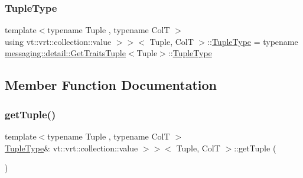 \subsubsection{\texorpdfstring{Tuple\+Type}{TupleType}}
{\footnotesize\ttfamily template$<$typename Tuple , typename ColT $>$ \\
using vt\+::vrt\+::collection\+::value $>$$>$$<$ Tuple, ColT $>$\+::\hyperlink{structvt_1_1vrt_1_1collection_1_1_param_col_msg_3_01_tuple_00_01_col_t_00_01std_1_1enable__if__te13868956e9675e27cec8f332bda9d5e_a86867847002b70c52126323faa830dd6}{Tuple\+Type} =  typename \hyperlink{structvt_1_1messaging_1_1detail_1_1_get_traits_tuple}{messaging\+::detail\+::\+Get\+Traits\+Tuple}$<$Tuple$>$\+::\hyperlink{structvt_1_1vrt_1_1collection_1_1_param_col_msg_3_01_tuple_00_01_col_t_00_01std_1_1enable__if__te13868956e9675e27cec8f332bda9d5e_a86867847002b70c52126323faa830dd6}{Tuple\+Type}}



\subsection{Member Function Documentation}
\mbox{\label{structvt_1_1vrt_1_1collection_1_1_param_col_msg_3_01_tuple_00_01_col_t_00_01std_1_1enable__if__te13868956e9675e27cec8f332bda9d5e_afc5714cc55c3b21fb9f1093863ad29b6}} 
\subsubsection{\texorpdfstring{get\+Tuple()}{getTuple()}}
{\footnotesize\ttfamily template$<$typename Tuple , typename ColT $>$ \\
\hyperlink{structvt_1_1vrt_1_1collection_1_1_param_col_msg_3_01_tuple_00_01_col_t_00_01std_1_1enable__if__te13868956e9675e27cec8f332bda9d5e_a86867847002b70c52126323faa830dd6}{Tuple\+Type}\& vt\+::vrt\+::collection\+::value $>$$>$$<$ Tuple, ColT $>$\+::get\+Tuple (\begin{DoxyParamCaption}{ }\end{DoxyParamCaption})\hspace{0.3cm}{\ttfamily [inline]}}

